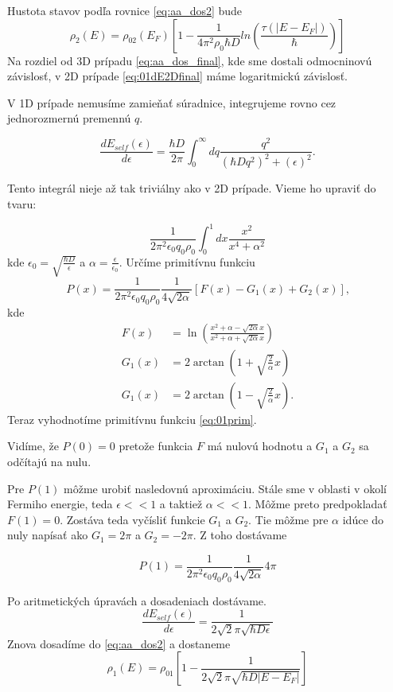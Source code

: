  Hustota stavov podľa rovnice \eqref{eq:aa_dos2} bude
 \begin{equation}
 \label{eq:01dos__2D} 
 \rho_2(E)=\rho_{02}(E_F)[1-\frac{1}{4\pi^2 \rho_0 \hbar D} ln(\frac{\tau(|E-E_F|)}
{\hbar})]
 \end{equation}
 Na rozdiel od 3D prípadu \eqref{eq:aa_dos_final}, kde sme dostali odmocninovú závislosť, 
v 2D prípade  \eqref{eq:01dE2Dfinal} máme logaritmickú závislosť.

V 1D prípade nemusíme zamieňať súradnice, integrujeme rovno cez jednorozmernú 
premennú $q$.

\begin{equation}
 \label{eq:aa_selfenergy_der}
 \frac{dE_{self}(\epsilon)}{d\epsilon}=\frac{\hbar D}{2\pi}\int_0^\infty dq\frac{ q^2}{(\hbar Dq^2)^2+(\epsilon)^2}\text{.}
\end{equation}

Tento integrál nieje až tak triviálny ako v 2D prípade. Vieme ho upraviť do tvaru:

\begin{equation}
\frac{1}{2\pi^2\epsilon_0 q_0 \rho_0}\int_0^{1} dx \frac{x^2}{x^4+\alpha^2}
\end{equation}
kde $\epsilon_0=\sqrt{\frac{\hbar D}{\epsilon}}$ a $\alpha=\frac{\epsilon}{\epsilon_0}$. Určíme primitívnu funkciu
\begin{equation}
\label{eq:01prim}
P(x)=\frac{1}{2\pi^2\epsilon_0 q_0 \rho_0}\frac{1}{4\sqrt {2 \alpha} }[ F(x)-G_1(x)+G_2(x)] \text{,}
\end{equation}
kde
\begin{align}
F(x)&=\ln(\frac { x^2+\alpha-\sqrt{2\alpha}x }{ x^2+\alpha+\sqrt{2\alpha}x })\\
G_1(x)&=2\arctan(1+\sqrt{\frac{2}{ \alpha}}x)\\
G_1(x)&=2\arctan(1-\sqrt{\frac{2}{ \alpha}}x) \text{.}
\end{align}
 Teraz vyhodnotíme primitívnu funkciu \eqref{eq:01prim}.
 
  Vidíme, že $P(0)=0$ pretože funkcia  $F$ má nulovú hodnotu  a $G_1$ a $G_2$ sa odčítajú na nulu. 
  
  Pre $P(1)$ môžme urobiť nasledovnú aproximáciu. Stále sme v oblasti v okolí Fermiho 
  energie, teda $\epsilon << 1$ a taktiež $\alpha<<1$. Môžme preto predpokladať $F(1)=0$.
Zostáva teda vyčísliť funkcie $G_1$ a $G_2$. Tie môžme pre $\alpha$ idúce do nuly napísať ako $G_1=2\pi$ a $G_2=-2\pi$. Z toho dostávame 

\begin{equation}
\label{eq:01primApprox}
P(1)=\frac{1}{2\pi^2\epsilon_0 q_0 \rho_0}\frac{1}{4\sqrt {2 \alpha} } 4\pi
\end{equation}    

Po aritmetických úpravách a dosadeniach dostávame.
\begin{equation}
\frac{dE_{self}(\epsilon)}{d\epsilon}=\frac{1}{2\sqrt{2}\pi \sqrt{\hbar D\epsilon}}
\end{equation}
Znova dosadíme do \eqref{eq:aa_dos2} a dostaneme
\begin{equation}
\label{eq:01dos2D}
\rho_1(E)=\rho_{01}[1-\frac{1}{2\sqrt{2}\pi \sqrt{\hbar D|E-E_F|}}]
\end{equation}
 